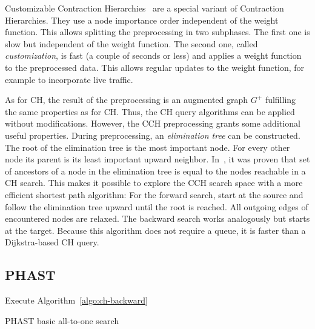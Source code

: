 \documentclass[manuscript,review]{acmart}
\begin{document}
Customizable Contraction Hierarchies~\cite{dsw-cch-15} are a special variant of Contraction Hierarchies.
They use a node importance order independent of the weight function.
This allows splitting the preprocessing in two subphases.
The first one is slow but independent of the weight function.
The second one, called \emph{customization}, is fast (a couple of seconds or less) and applies a weight function to the preprocessed data.
This allows regular updates to the weight function, for example to incorporate live traffic.

As for CH, the result of the preprocessing is an augmented graph $G^+$ fulfilling the same properties as for CH.
Thus, the CH query algorithms can be applied without modifications.
However, the CCH preprocessing grants some additional useful properties.
During preprocessing, an \emph{elimination tree} can be constructed.
The root of the elimination tree is the most important node.
For every other node its parent is its least important upward neighbor.
In~\cite{bcrw-s-16}, it was proven that set of ancestors of a node in the elimination tree is equal to the nodes reachable in a CH search.
This makes it possible to explore the CCH search space with a more efficient shortest path algorithm:
For the forward search, start at the source and follow the elimination tree upward until the root is reached.
All outgoing edges of encountered nodes are relaxed.
The backward search works analogously but starts at the target.
Because this algorithm does not require a queue, it is faster than a Dijkstra-based CH query.

\subsection{PHAST}

\begin{algorithm2e}
Execute Algorithm~\ref{algo:ch-backward}\;
\caption{PHAST basic all-to-one search}
\label{algo:phast}
\end{algorithm2e}
\end{document}
